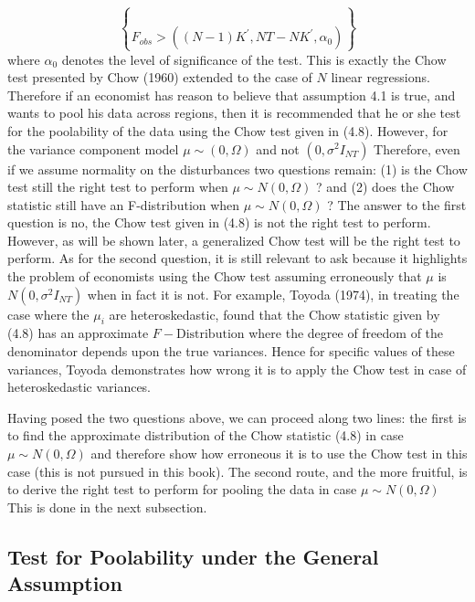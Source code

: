 \documentclass[
]{book}
\begin{document}
\[\brace  F_{obs}> \left(\left(N-1 \right)K^{\prime}, NT-NK^{\prime} ,\alpha_0 \right)      \]
where \(\alpha_0\) denotes the level of significance of the test. This is exactly the Chow test presented by Chow (1960) extended to the case of \(N\) linear regressions. Therefore if an economist has reason to believe that assumption 4.1 is true, and wants to pool his data across regions, then it is recommended that he or she test for the poolability of the data using the Chow test given in (4.8). However, for the variance component model \(\mu \sim \left(0,\Omega \right)\) and not \(\left(0,\sigma^2 I_{NT} \right)\) Therefore, even if we assume normality on the disturbances two questions remain: (1) is the Chow test still the right test to perform when \(\mu \sim N\left(0,\Omega \right)\) ? and (2) does the Chow statistic still have an
F-distribution when \(\mu \sim N\left(0,\Omega \right)\) ? The answer to the first question is no, the Chow test given
in (4.8) is not the right test to perform. However, as will be shown later, a generalized Chow
test will be the right test to perform. As for the second question, it is still relevant to ask because
it highlights the problem of economists using the Chow test assuming erroneously that \(\mu\) is \(N\left(0,\sigma^2 I_{NT} \right)\) when in fact it is not. For example, Toyoda (1974), in treating the case where
the \(\mu_i\) are heteroskedastic, found that the Chow statistic given by (4.8) has an approximate \(F-\text{Distribution}\) where the degree of freedom of the denominator depends upon the true variances.
Hence for specific values of these variances, Toyoda demonstrates how wrong it is to apply the Chow test in case of heteroskedastic variances.

Having posed the two questions above, we can proceed along two lines: the first is to find the approximate distribution of the Chow statistic (4.8) in case \(\mu \sim N \left(0,\Omega \right)\) and therefore show
how erroneous it is to use the Chow test in this case (this is not pursued in this book). The second route, and the more fruitful, is to derive the right test to perform for pooling the data in case \(\mu \sim N \left(0,\Omega \right)\) This is done in the next subsection.

\hypertarget{test-for-poolability-under-the-general-assumption}{%
\subsection{Test for Poolability under the General Assumption}\label{test-for-poolability-under-the-general-assumption}}
\end{document}
